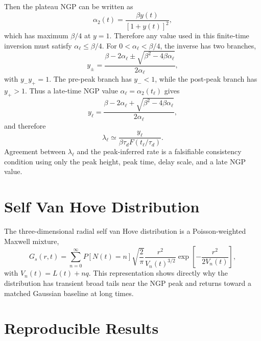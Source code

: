 \documentclass[aps,preprint,onecolumn,superscriptaddress,nofootinbib]{revtex4-2}
\begin{document}
Then the plateau NGP can be written as
\begin{equation}
  \alpha_2(t)=\frac{\beta y(t)}{[1+y(t)]^2},
\end{equation}
which has maximum $\beta/4$ at $y=1$. Therefore any value used in this
finite-time inversion must satisfy $\alpha_\ell\le \beta/4$. For
$0<\alpha_\ell<\beta/4$, the inverse has two branches,
\begin{equation}
  y_{\pm}=
  \frac{\beta-2\alpha_\ell\pm\sqrt{\beta^2-4\beta\alpha_\ell}}
       {2\alpha_\ell},
\end{equation}
with $y_-y_+=1$. The pre-peak branch has $y_-<1$, while the post-peak branch
has $y_+>1$. Thus a late-time NGP value $\alpha_\ell=\alpha_2(t_\ell)$ gives
\begin{equation}
  y_\ell=
  \frac{\beta-2\alpha_\ell+\sqrt{\beta^2-4\beta\alpha_\ell}}
       {2\alpha_\ell},
\end{equation}
and therefore
\begin{equation}
  \lambda_\ell\simeq
  \frac{y_\ell}{\beta\tau_d F(t_\ell/\tau_d)}.
\end{equation}
Agreement between $\lambda_\ell$ and the peak-inferred rate is a falsifiable
consistency condition using only the peak height, peak time, delay scale, and a
late NGP value.

\section{Self Van Hove Distribution}

The three-dimensional radial self van Hove distribution is a Poisson-weighted
Maxwell mixture,
\begin{equation}
  G_s(r,t)=\sum_{n=0}^\infty P[N(t)=n]
  \sqrt{\frac{2}{\pi}}\frac{r^2}{V_n(t)^{3/2}}
  \exp\left[-\frac{r^2}{2V_n(t)}\right],
\end{equation}
with $V_n(t)=L(t)+nq$. This representation shows directly why the distribution
has transient broad tails near the NGP peak and returns toward a matched
Gaussian baseline at long times.

\section{Reproducible Results}
\end{document}

